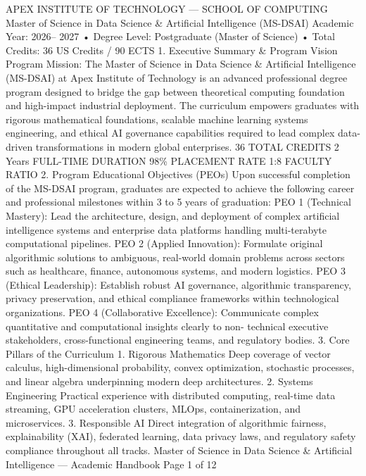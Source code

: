 \documentclass[12pt]{article}
\begin{document}
APEX INSTITUTE OF TECHNOLOGY — SCHOOL OF COMPUTING
Master of Science in Data Science \& Artificial
Intelligence (MS-DSAI)
Academic Year: 2026–
2027
•
Degree Level: Postgraduate (Master of
Science)
•
Total Credits: 36 US Credits / 90
ECTS
1. Executive Summary \& Program Vision
Program Mission: The Master of Science in Data Science \& Artificial Intelligence (MS-DSAI) at Apex Institute of
Technology is an advanced professional degree program designed to bridge the gap between theoretical
computing foundation and high-impact industrial deployment. The curriculum empowers graduates with
rigorous mathematical foundations, scalable machine learning systems engineering, and ethical AI governance
capabilities required to lead complex data-driven transformations in modern global enterprises.
36
TOTAL CREDITS
2 Years
FULL-TIME DURATION
98\%
PLACEMENT RATE
1:8
FACULTY RATIO
2. Program Educational Objectives (PEOs)
Upon successful completion of the MS-DSAI program, graduates are expected to achieve the following career and
professional milestones within 3 to 5 years of graduation:
PEO 1 (Technical Mastery): Lead the architecture, design, and deployment of complex artificial intelligence systems and
enterprise data platforms handling multi-terabyte computational pipelines.
PEO 2 (Applied Innovation): Formulate original algorithmic solutions to ambiguous, real-world domain problems across
sectors such as healthcare, finance, autonomous systems, and modern logistics.
PEO 3 (Ethical Leadership): Establish robust AI governance, algorithmic transparency, privacy preservation, and ethical
compliance frameworks within technological organizations.
PEO 4 (Collaborative Excellence): Communicate complex quantitative and computational insights clearly to non-
technical executive stakeholders, cross-functional engineering teams, and regulatory bodies.
3. Core Pillars of the Curriculum
1. Rigorous Mathematics
Deep coverage of vector calculus,
high-dimensional probability, convex
optimization, stochastic processes,
and linear algebra underpinning
modern deep architectures.
2. Systems Engineering
Practical experience with distributed
computing, real-time data streaming,
GPU acceleration clusters, MLOps,
containerization, and microservices.
3. Responsible AI
Direct integration of algorithmic
fairness, explainability (XAI),
federated learning, data privacy laws,
and regulatory safety compliance
throughout all tracks.
Master of Science in Data Science \& Artificial Intelligence — Academic Handbook
Page 1 of 12
\end{document}
